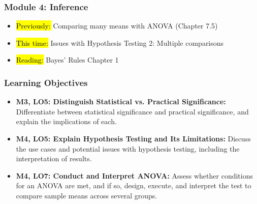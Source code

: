 
\begin{frame}
    \frametitle{Module 4: Inference}
    \begin{itemize}
        \item \hl{Previously: }Comparing many means with ANOVA (Chapter 7.5)
        \item \hl{This time: }Issues with Hypothesis Testing 2: Multiple comparisons
        \item \hl{Reading: }Bayes' Rules Chapter 1
    \end{itemize}

\end{frame}
\begin{frame}
    \frametitle{Learning Objectives}
    \begin{itemize}
        \item \textbf{M3, LO5: Distinguish Statistical vs. Practical Significance:} Differentiate between statistical significance and practical significance, and explain the implications of each.
        \item \textbf{M4, LO5: Explain Hypothesis Testing and Its Limitations:} Discuss the use cases and potential issues with hypothesis testing, including the interpretation of results.
        \item \textbf{M4, LO7: Conduct and Interpret ANOVA:} Assess whether conditions for an ANOVA are met, and if so, design, execute, and interpret the test to compare sample means across several groups.
    \end{itemize}
\end{frame}
